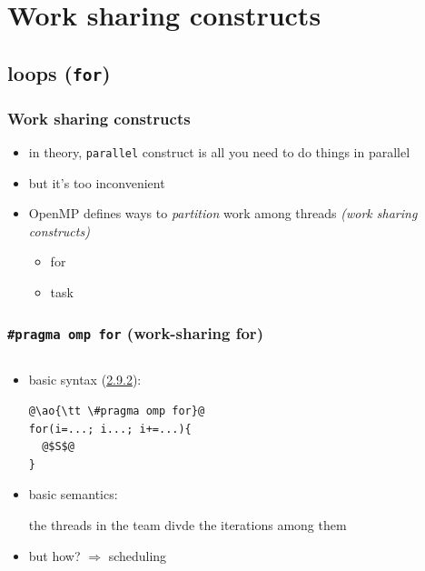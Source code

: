 \documentclass[12pt,dvipdfmx]{beamer}
\newcommand{\sectionompfor}{{\href{https://www.openmp.org/spec-html/5.0/openmpsu41.html\#x64-1290002.9.2}{2.9.2}}}
\newcommand{\ao}[1]{{\color{blue}#1}}
\begin{document}
\section{Work sharing constructs}

\subsection{loops ({\tt for})}

\begin{frame}[fragile]
\frametitle{Work sharing constructs}
\begin{itemize}
\item in theory, \ao{\tt parallel} construct is all you need 
  to do things in parallel
\item but it's too inconvenient
\item OpenMP defines ways to \ao{\em partition} work among threads
  \ao{\em (work sharing constructs)}
  \begin{itemize}
  \item for
  \item task
  \end{itemize}
\end{itemize}
\end{frame}

\begin{frame}[fragile]
\frametitle{{\tt \#pragma omp for} (work-sharing for)}
\begin{columns}

\begin{column}{0.5\textwidth}
  \begin{itemize}
\item basic syntax (\sectionompfor):
\begin{lstlisting}
@\ao{\tt \#pragma omp for}@
for(i=...; i...; i+=...){
  @$S$@
}
\end{lstlisting}

\item basic semantics:

the threads in the team divde the iterations among them

\item but how? $\Rightarrow$ scheduling
\end{itemize}
\end{column}

\begin{column}{0.5\textwidth}
\def\svgwidth{0.8\textwidth}
{\scriptsize }
\end{column}
\end{columns}
\end{frame}
\end{document}
